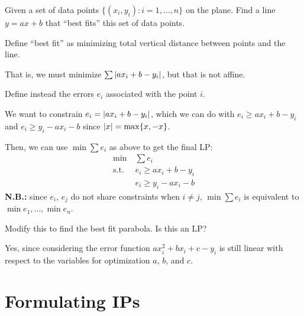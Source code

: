 \begin{example}
  Given a set of data points $\{(x_i, y_i) : i = 1,\dotsc,n\}$ on the plane. Find a line $y = ax + b$ that ``best fits'' this set of data points.
\end{example}
\begin{sol}
  Define ``best fit'' as minimizing total vertical distance between points and the line.

  That is, we must minimize $\sum \abs{ax_i + b - y_i}$, but that is not affine.

  Define instead the errors $e_i$ associated with the point $i$.

  We want to constrain $e_i = \abs{ax_i + b - y_i}$, which we can do with $e_i \geq ax_i + b - y_i$ and $e_i \geq y_i - ax_i - b$ since $\abs{x} = \max\{x, -x\}$.

  Then, we can use $\min \sum e_i$ as above to get the final LP:
  \begin{align*}
    \min \        & \sum e_i                \\
    \text{s.t.}\  & e_i \geq ax_i + b - y_i \\
                  & e_i \geq y_i - ax_i - b
  \end{align*}
  \textbf{N.B.:} since $e_i$, $e_j$ do not share constraints when $i \neq j$, $\min \sum e_i$ is equivalent to $\min e_1, \dotsc, \min e_n$.
\end{sol}

\begin{xca}
  Modify this to find the best fit parabola. Is this an LP?
\end{xca}
\begin{sol}
  Yes, since considering the error function $ax_i^2 + bx_i + c - y_i$ is still linear with respect to the variables for optimization $a$, $b$, and $c$.
\end{sol}

\section{Formulating IPs}

